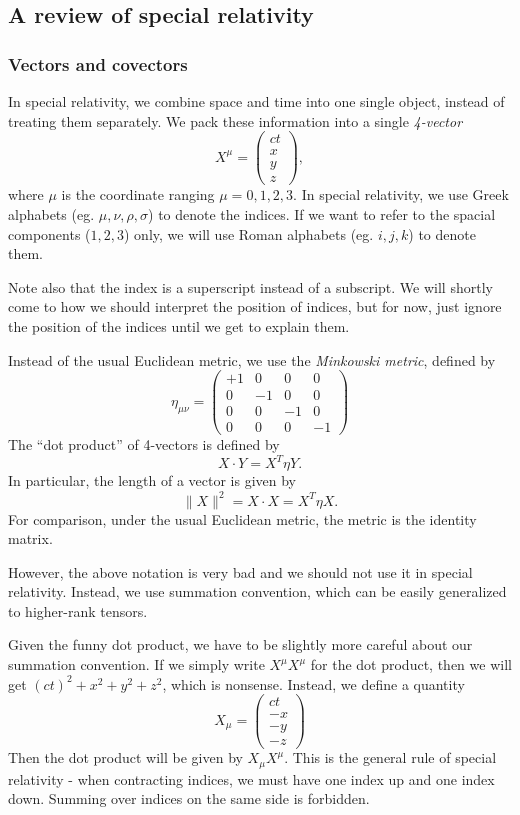 \documentclass[a4paper]{article}
\begin{document}
\subsection{A review of special relativity}
\subsubsection{Vectors and covectors}
In special relativity, we combine space and time into one single object, instead of treating them separately. We pack these information into a single \emph{4-vector}
\[
  X^\mu =
  \begin{pmatrix}
    ct\\
    x\\
    y\\
    z
  \end{pmatrix},
\]
where $\mu$ is the coordinate ranging $\mu = 0, 1, 2, 3$. In special relativity, we use Greek alphabets (eg. $\mu, \nu, \rho, \sigma$) to denote the indices. If we want to refer to the spacial components ($1, 2, 3$) only, we will use Roman alphabets (eg. $i, j, k$) to denote them.

Note also that the index is a superscript instead of a subscript. We will shortly come to how we should interpret the position of indices, but for now, just ignore the position of the indices until we get to explain them.

Instead of the usual Euclidean metric, we use the \emph{Minkowski metric}, defined by
\[
  \eta_{\mu\nu} =
  \begin{pmatrix}
    +1 & 0 & 0 & 0\\
    0 & -1 & 0 & 0\\
    0 & 0 & -1 & 0\\
    0 & 0 & 0 & -1
  \end{pmatrix}
\]
The ``dot product'' of 4-vectors is defined by
\[
  X\cdot Y = X^T\eta Y.
\]
In particular, the length of a vector is given by
\[
  \|X\|^2 = X\cdot X = X^T\eta X.
\]
For comparison, under the usual Euclidean metric, the metric is the identity matrix.

However, the above notation is very bad and we should not use it in special relativity. Instead, we use summation convention, which can be easily generalized to higher-rank tensors.

Given the funny dot product, we have to be slightly more careful about our summation convention. If we simply write $X^\mu X^\mu$ for the dot product, then we will get $(ct)^2 + x^2 + y^2 + z^2$, which is nonsense. Instead, we define a quantity
\[
  X_\mu = \begin{pmatrix}
    ct\\
    -x\\
    -y\\
    -z
  \end{pmatrix}
\]
Then the dot product will be given by $X_\mu X^\mu$. This is the general rule of special relativity - when contracting indices, we must have one index up and one index down. Summing over indices on the same side is forbidden.
\end{document}
